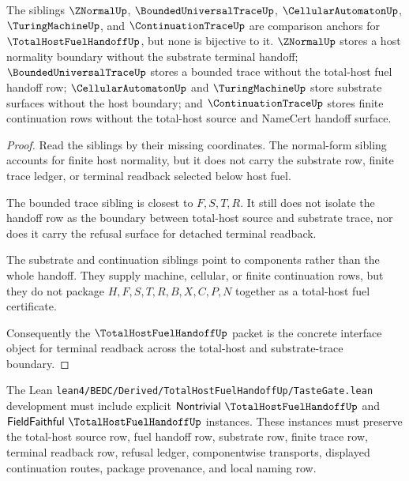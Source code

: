 \begin{theorem}
\label{thm:total-host-fuel-handoff-sibling-boundary}
The siblings $\ZNormalUp$, $\BoundedUniversalTraceUp$, $\CellularAutomatonUp$, $\TuringMachineUp$, and $\ContinuationTraceUp$ are comparison anchors for $\TotalHostFuelHandoffUp$, but none is bijective to it. $\ZNormalUp$ stores a host normality boundary without the substrate terminal handoff; $\BoundedUniversalTraceUp$ stores a bounded trace without the total-host fuel handoff row; $\CellularAutomatonUp$ and $\TuringMachineUp$ store substrate surfaces without the host boundary; and $\ContinuationTraceUp$ stores finite continuation rows without the total-host source and NameCert handoff surface.
\end{theorem}
\begin{proof}
Read the siblings by their missing coordinates. The normal-form sibling accounts for finite host normality, but it does not carry the substrate row, finite trace ledger, or terminal readback selected below host fuel.

The bounded trace sibling is closest to $F,S,T,R$. It still does not isolate the handoff row as the boundary between total-host source and substrate trace, nor does it carry the refusal surface for detached terminal readback.

The substrate and continuation siblings point to components rather than the whole handoff. They supply machine, cellular, or finite continuation rows, but they do not package $H,F,S,T,R,B,X,C,P,N$ together as a total-host fuel certificate.

Consequently the $\TotalHostFuelHandoffUp$ packet is the concrete interface object for terminal readback across the total-host and substrate-trace boundary.
\end{proof}

The Lean \texttt{lean4/BEDC/Derived/TotalHostFuelHandoffUp/TasteGate.lean} development must include explicit $\mathsf{Nontrivial}\ \TotalHostFuelHandoffUp$ and $\mathsf{FieldFaithful}\ \TotalHostFuelHandoffUp$ instances. These instances must preserve the total-host source row, fuel handoff row, substrate row, finite trace row, terminal readback row, refusal ledger, componentwise transports, displayed continuation routes, package provenance, and local naming row.

